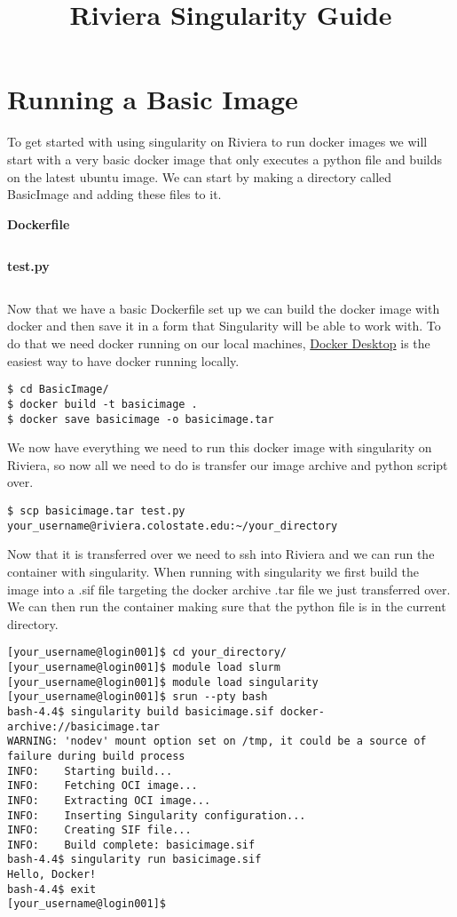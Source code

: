 \documentclass[11pt,letterpaper]{article}
\title{Riviera Singularity Guide}
\begin{document}
\startdoc

\section{Running a Basic Image}
To get started with using singularity on Riviera to run docker images we will start with a very basic docker image that only executes a python file and builds on the latest ubuntu image. We can start by making a directory called BasicImage and adding these files to it.

\noindent\textbf{Dockerfile}\vspace{-1em}
\inputminted{docker}{Dockerfiles/BasicImage/Dockerfile}

\noindent\textbf{test.py}\vspace{-1em}
\inputminted{python3}{Dockerfiles/BasicImage/test.py}

Now that we have a basic Dockerfile set up we can build the docker image with docker and then save it in a form that Singularity will be able to work with. To do that we need docker running on our local machines, \href{https://www.docker.com/products/docker-desktop/}{Docker Desktop} is the easiest way to have docker running locally. 

\begin{verbatim}
$ cd BasicImage/
$ docker build -t basicimage .
$ docker save basicimage -o basicimage.tar
\end{verbatim}

We now have everything we need to run this docker image with singularity on Riviera, so now all we need to do is transfer our image archive and python script over.

\begin{verbatim}
$ scp basicimage.tar test.py your_username@riviera.colostate.edu:~/your_directory
\end{verbatim}

Now that it is transferred over we need to ssh into Riviera and we can run the container with singularity. When running with singularity we first build the image into a .sif file targeting the docker archive .tar file we just transferred over. We can then run the container making sure that the python file is in the current directory.

\begin{verbatim}
[your_username@login001]$ cd your_directory/
[your_username@login001]$ module load slurm
[your_username@login001]$ module load singularity
[your_username@login001]$ srun --pty bash
bash-4.4$ singularity build basicimage.sif docker-archive://basicimage.tar
WARNING: 'nodev' mount option set on /tmp, it could be a source of failure during build process
INFO:    Starting build...
INFO:    Fetching OCI image...
INFO:    Extracting OCI image...
INFO:    Inserting Singularity configuration...
INFO:    Creating SIF file...
INFO:    Build complete: basicimage.sif
bash-4.4$ singularity run basicimage.sif
Hello, Docker!
bash-4.4$ exit
[your_username@login001]$
\end{verbatim}
\end{document}
